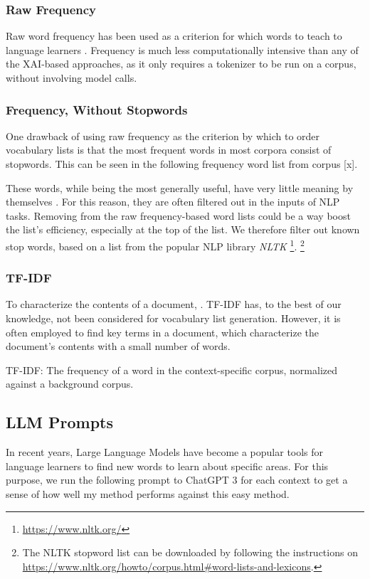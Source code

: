 \subsubsection{Raw Frequency}

Raw word frequency has been used as a criterion for which words to teach to language learners \cite{heChoosingWordsTeach2019}.
Frequency is much less computationally intensive than any of the XAI-based approaches, as it only requires a tokenizer to be run on a corpus, without involving model calls.

\subsubsection{Frequency, Without Stopwords}
One drawback of using raw frequency as the criterion by which to order vocabulary lists is that the most frequent words in most corpora consist of stopwords.
This can be seen in the following frequency word list from corpus [x].

These words, while being the most generally useful, have very little meaning by themselves \cite{rajaraman2011data}.
For this reason, they are often filtered out in the inputs of NLP tasks.
Removing from the raw frequency-based word lists could be a way boost the list's  efficiency, especially at the top of the list.
We therefore filter out known stop words, based on a list from the popular NLP library \textit{NLTK} \footnote{\url{https://www.nltk.org/}}.
\footnote{The NLTK stopword list can be downloaded by following the instructions on \url{https://www.nltk.org/howto/corpus.html\#word-lists-and-lexicons}.}


\subsubsection{TF-IDF}
To characterize the contents of a document, \cite{qaiserTextMiningUse2018}.
TF-IDF has, to the best of our knowledge, not been considered for vocabulary list generation.
However, it is often employed to find key terms in a document, which characterize the document's contents with a small number of words.

TF-IDF: The frequency of a word in the context-specific corpus, normalized against a background corpus.

\subsection{LLM Prompts}
In recent years, Large Language Models have become a popular tools for language learners to find new words to learn about specific areas.
For this purpose, we run the following prompt to ChatGPT 3 for each context to get a sense of how well my method performs against this easy method.

